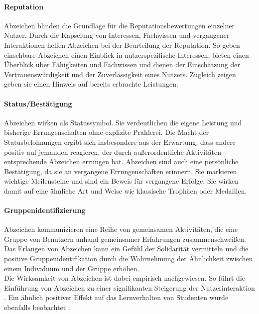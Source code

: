 \paragraph{Reputation}
Abzeichen blinden die Grundlage für die Reputationsbewertungen einzelner Nutzer. Durch die Kapselung von Interessen, Fachwissen und vergangener Interaktionen helfen Abzeichen bei der Beurteilung der Reputation. So geben einsehbare Abzeichen einen Einblick in nutzerspezifische Interessen, bieten einen Überblick über Fähigkeiten und Fachwissen und dienen der Einschätzung der Vertrauenswürdigkeit und der Zuverlässigkeit eines Nutzers. Zugleich zeigen geben sie einen Hinweis auf bereits erbrachte Leistungen.

\paragraph{Status/Bestätigung}
Abzeichen wirken als Statussymbol. Sie verdeutlichen die eigene Leistung und bisherige Errungenschaften ohne explizite Prahlerei.
Die Macht der Statusbelohnungen ergibt sich insbesondere aus der Erwartung, dass andere positiv auf jemanden reagieren, der durch außerordentliche Aktivitäten entsprechende Abzeichen errungen hat. Abzeichen sind auch eine persönliche Bestätigung, da sie an vergangene Errungenschaften erinnern. Sie markieren wichtige Meilensteine und sind ein Beweis für vergangene Erfolge. Sie wirken damit auf eine ähnliche Art und Weise wie klassische Trophäen oder Medaillen.

\paragraph{Gruppenidentifizierung}
Abzeichen kommunizieren eine Reihe von gemeinsamen Aktivitäten, die eine Gruppe von Benutzern anhand gemeinsamer Erfahrungen zusammenschweißen. Das Erlangen von Abzeichen kann ein Gefühl der Solidarität vermitteln und die positive Gruppenidentifikation durch die Wahrnehmung der Ähnlichkeit zwischen einem Individuum und der Gruppe erhöhen.\\

Die Wirksamkeit von Abzeichen ist dabei empirisch nachgewiesen. So führt die Einführung von Abzeichen zu einer signifikanten Steigerung der Nutzerinteraktion \cite{hamari_badges_2017}. Ein ähnlich positiver Effekt auf das Lernverhalten von Studenten wurde ebenfalls beobachtet \cite{hamzah_influence_2015}.

